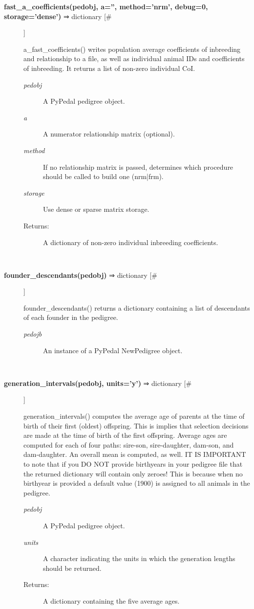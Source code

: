 \documentclass{article}
\begin{document}
\begin{description}
\item[\textbf{fast\_a\_coefficients(pedobj, a='', method='nrm', debug=0, storage='dense')} ⇒ dictionary [\#]
]
\par a\_fast\_coefficients() writes population average coefficients of inbreeding and
relationship to a file, as well as individual animal IDs and coefficients of
inbreeding.  It returns a list of non-zero individual CoI.
\begin{description}
\item[\textit{pedobj}
]
A PyPedal pedigree object.
\item[\textit{a}
]
A numerator relationship matrix (optional).
\item[\textit{method}
]
If no relationship matrix is passed, determines which procedure should be called to build one (nrm|frm).
\item[\textit{storage}
]
Use dense or sparse matrix storage.
\item[Returns:
]
A dictionary of non-zero individual inbreeding coefficients.
\end{description}\\

\item[\textbf{founder\_descendants(pedobj)} ⇒ dictionary [\#]
]
\par founder\_descendants() returns a dictionary containing a list of descendants of
each founder in the pedigree.
\begin{description}
\item[\textit{pedojb}
]
An instance of a PyPedal NewPedigree object.
\end{description}\\

\item[\textbf{generation\_intervals(pedobj, units='y')} ⇒ dictionary [\#]
]
\par generation\_intervals() computes the average age of parents at the time of
birth of their first (oldest) offspring.  This is implies that selection
decisions are made at the time of birth of the first offspring.  Average
ages are computed for each of four paths: sire-son, sire-daughter, dam-son,
and dam-daughter.  An overall mean is computed, as well.  IT IS IMPORTANT
to note that if you DO NOT provide birthyears in your pedigree file that the
returned dictionary will contain only zeroes!  This is because when no birthyear
is provided a default value (1900) is assigned to all animals in the pedigree.
\begin{description}
\item[\textit{pedobj}
]
A PyPedal pedigree object.
\item[\textit{units}
]
A character indicating the units in which the generation lengths should be returned.
\item[Returns:
]
A dictionary containing the five average ages.
\end{description}\\


\end{description}
\end{document}
